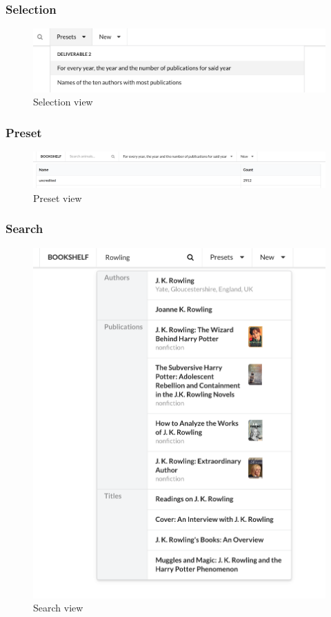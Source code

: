 \documentclass[doubleside, titlepage]{article}
\begin{document}
\subsubsection{Selection}
\begin{figure}[!htb]
	\centering
    \includegraphics[scale = 0.5]{ui-selection}
    \caption{Selection view}
\end{figure}

\subsubsection{Preset}
\begin{figure}[!htb]
  \centering
  \includegraphics[scale = 0.45]{ui-preset}
  \caption{Preset view}
\end{figure}

\newpage

\subsubsection{Search}
\begin{figure}[!htb]
	\centering
    \includegraphics[scale = 0.4]{ui-search}
    \caption{Search view}
\end{figure}
\end{document}
